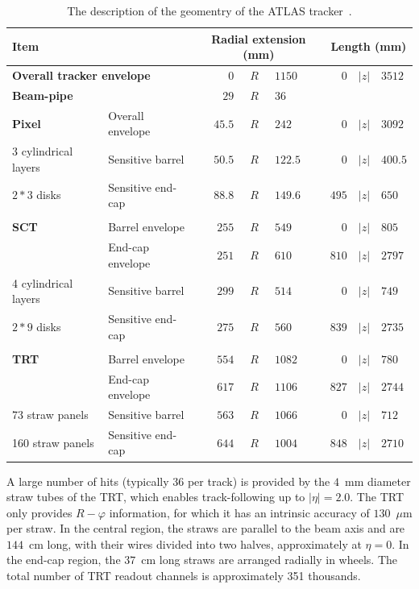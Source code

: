 \begin{table}
\centering
\begin{tabular}{ll | r@{$<$}c@{$<$}l | r@{$<$}c@{$<$}l} \hline\hline
\multicolumn{2}{l|}{\bf Item} & \multicolumn{3}{c|}{\bf Radial extension (mm)} & \multicolumn{3}{c}{\bf Length (mm)} \\\hline
\multicolumn{2}{l|}{\bf Overall tracker envelope} & $0$&$R$&$1150$ & $0$&$|z|$&$3512$ \\
\multicolumn{2}{l|}{\bf Beam-pipe} & $29$&$R$&$36$ & \multicolumn{3}{c}{}\\\hline
{\bf Pixel} & Overall envelope & $45.5$&$R$&$242$ & $0$&$|z|$&$3092$ \\
3 cylindrical layers & Sensitive barrel & $50.5$&$R$&$122.5$ & $0$&$|z|$&$400.5$ \\
$2*3$ disks & Sensitive end-cap & $88.8$&$R$&$149.6$ & $495$&$|z|$&$650$ \\
\multicolumn{2}{l|}{} & \multicolumn{3}{c|}{} & \multicolumn{3}{c}{}\\
{\bf SCT} & Barrel envelope & $255$&$R$&$549$ & $0$&$|z|$&$805$ \\
 & End-cap envelope & $251$&$R$&$610$ & $810$&$|z|$&$2797$ \\
4 cylindrical layers & Sensitive barrel & $299$&$R$&$514$ & $0$&$|z|$&$749$ \\
$2*9$ disks & Sensitive end-cap & $275$&$R$&$560$ & $839$&$|z|$&$2735$ \\
\multicolumn{2}{l|}{} & \multicolumn{3}{c|}{} & \multicolumn{3}{c}{}\\
{\bf TRT} & Barrel envelope & $554$&$R$&$1082$ & $0$&$|z|$&$780$ \\
 & End-cap envelope & $617$&$R$&$1106$ & $827$&$|z|$&$2744$ \\
73 straw panels & Sensitive barrel & $563$&$R$&$1066$ & $0$&$|z|$&$712$ \\
160 straw panels & Sensitive end-cap & $644$&$R$&$1004$ & $848$&$|z|$&$2710$ \\
\hline\hline
\end{tabular}
\caption{The description of the geomentry of the ATLAS tracker~\cite{lib:ATLASdet}.}
\label{tab:ATLAS_tracker}
\end{table}

A large number of hits (typically 36 per track) is provided by the $4$~mm diameter straw tubes
of the TRT, which enables track-following up to $|\eta|=2.0$. The TRT only provides $R-\varphi$ information, for which it has an intrinsic accuracy of $130$~$\mu$m per straw. In the central region, the straws are
parallel to the beam axis and are $144$~cm long, with their wires divided into two halves, approximately at $\eta = 0$. In the end-cap region, the $37$~cm long straws are arranged radially in wheels. The
total number of TRT readout channels is approximately 351 thousands.

